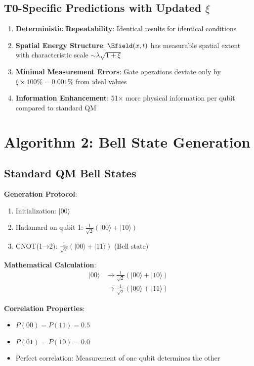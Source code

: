 	\subsection{T0-Specific Predictions with Updated $\xi$}
	
	\begin{enumerate}
		\item \textbf{Deterministic Repeatability}: Identical results for identical conditions
		\item \textbf{Spatial Energy Structure}: $\Efield(x,t)$ has measurable spatial extent with characteristic scale $\sim \lambda \sqrt{1+\xi}$
		\item \textbf{Minimal Measurement Errors}: Gate operations deviate only by $\xi \times 100\% = 0.001\%$ from ideal values
		\item \textbf{Information Enhancement}: 51× more physical information per qubit compared to standard QM
	\end{enumerate}
	
	\section{Algorithm 2: Bell State Generation}
	
	\subsection{Standard QM Bell States}
	
	\textbf{Generation Protocol}:
	\begin{enumerate}
		\item Initialization: $|00\rangle$
		\item Hadamard on qubit 1: $\frac{1}{\sqrt{2}}(|00\rangle + |10\rangle)$
		\item CNOT(1→2): $\frac{1}{\sqrt{2}}(|00\rangle + |11\rangle)$ (Bell state)
	\end{enumerate}
	
	\textbf{Mathematical Calculation}:
	\begin{align}
		|00\rangle &\rightarrow \frac{1}{\sqrt{2}}(|00\rangle + |10\rangle) \\
		&\rightarrow \frac{1}{\sqrt{2}}(|00\rangle + |11\rangle)
	\end{align}
	
	\textbf{Correlation Properties}:
	\begin{itemize}
		\item $P(00) = P(11) = 0.5$
		\item $P(01) = P(10) = 0.0$
		\item Perfect correlation: Measurement of one qubit determines the other
	\end{itemize}
	
